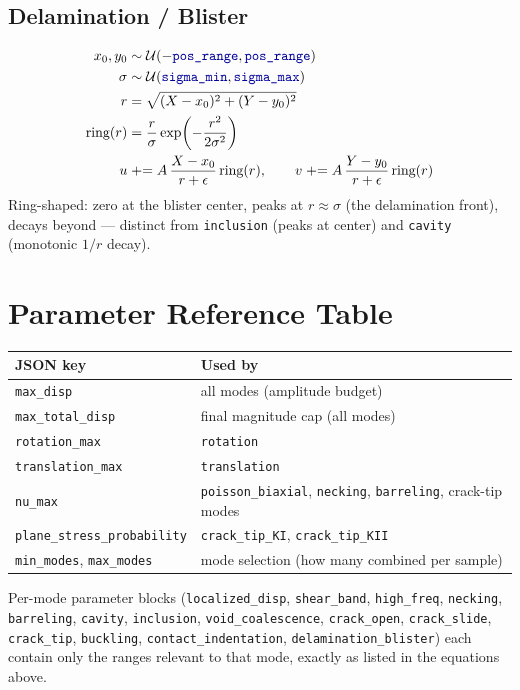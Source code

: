 \documentclass[11pt]{article}
\newcommand{\param}[1]{\texttt{\color{blue!60!black}#1}}
\begin{document}
\subsection{Delamination / Blister}
\begin{align}
x_0, y_0 &\sim \mathcal{U}(-\param{pos\_range}, \param{pos\_range}) \\
\sigma &\sim \mathcal{U}(\param{sigma\_min}, \param{sigma\_max}) \\
r &= \sqrt{(X-x_0)^2 + (Y-y_0)^2} \\
\text{ring}(r) &= \frac{r}{\sigma}\exp\!\left(-\frac{r^2}{2\sigma^2}\right) \\
u &\mathrel{+}= A\,\frac{X-x_0}{r+\epsilon}\,\text{ring}(r), \qquad
v \mathrel{+}= A\,\frac{Y-y_0}{r+\epsilon}\,\text{ring}(r)
\end{align}
Ring-shaped: zero at the blister center, peaks at $r \approx \sigma$ (the
delamination front), decays beyond — distinct from \texttt{inclusion}
(peaks at center) and \texttt{cavity} (monotonic $1/r$ decay).

\section*{Parameter Reference Table}

\begin{center}
\begin{tabular}{@{}ll@{}}
\toprule
\textbf{JSON key} & \textbf{Used by} \\
\midrule
\param{max\_disp} & all modes (amplitude budget) \\
\param{max\_total\_disp} & final magnitude cap (all modes) \\
\param{rotation\_max} & \texttt{rotation} \\
\param{translation\_max} & \texttt{translation} \\
\param{nu\_max} & \texttt{poisson\_biaxial}, \texttt{necking}, \texttt{barreling}, crack-tip modes \\
\param{plane\_stress\_probability} & \texttt{crack\_tip\_KI}, \texttt{crack\_tip\_KII} \\
\param{min\_modes}, \param{max\_modes} & mode selection (how many combined per sample) \\
\bottomrule
\end{tabular}
\end{center}

Per-mode parameter blocks (\param{localized\_disp}, \param{shear\_band},
\param{high\_freq}, \param{necking}, \param{barreling}, \param{cavity},
\param{inclusion}, \param{void\_coalescence}, \param{crack\_open},
\param{crack\_slide}, \param{crack\_tip}, \param{buckling},
\param{contact\_indentation}, \param{delamination\_blister})
each contain only the ranges relevant to that mode, exactly as listed
in the equations above.
\end{document}
